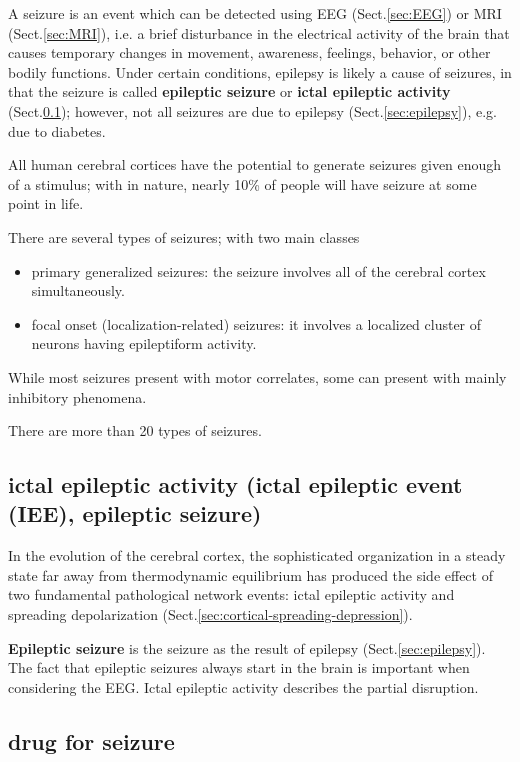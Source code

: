 A seizure is an event which can be detected using EEG (Sect.\ref{sec:EEG}) or
MRI (Sect.\ref{sec:MRI}), i.e. a brief disturbance in the electrical activity of
the brain that causes temporary changes in movement, awareness, feelings,
behavior, or other bodily functions. Under certain conditions, epilepsy is
likely a cause of seizures, in that the seizure is called {\bf epileptic
seizure} or {\bf ictal epileptic activity} (Sect.\ref{sec:epileptic-seizure});
however, not all seizures are due to epilepsy (Sect.\ref{sec:epilepsy}), e.g.
due to diabetes.

All human cerebral cortices have the potential to generate seizures given enough
of a stimulus; with in nature, nearly 10\% of people will have seizure at some
point in life.


There are several types of seizures; with two main classes 
\begin{itemize}
  \item primary generalized seizures: the seizure involves all of the cerebral
  cortex simultaneously.
  
  \item focal onset (localization-related) seizures:  it involves a localized
  cluster of neurons having epileptiform activity.
\end{itemize}
While most seizures present with motor correlates, some can present with mainly
inhibitory phenomena.

There are more than 20 types of seizures.

\subsection{ictal epileptic activity (ictal epileptic event (IEE), epileptic
seizure)}
\label{sec:epileptic-seizure}
\label{sec:epileptic-seizures}

In the evolution of the cerebral cortex, the sophisticated organization in a steady state far away
from thermodynamic equilibrium has produced the side effect of two fundamental pathological
network events: ictal epileptic activity and spreading depolarization
(Sect.\ref{sec:cortical-spreading-depression}).

{\bf Epileptic seizure} is the seizure as the result of epilepsy
(Sect.\ref{sec:epilepsy}). The fact that epileptic seizures always start in the
brain is important when considering the EEG. Ictal epileptic activity describes
the partial disruption.


\subsection{drug for seizure}
\label{sec:seizure-drug}

